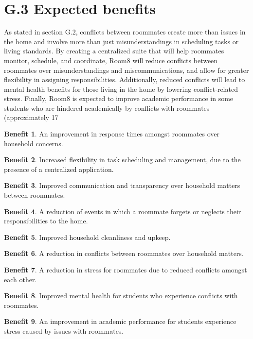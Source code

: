 \documentclass{scrreprt}
\newcommand*{\nsection}[1]{
    \section*{#1}
    \addcontentsline{toc}{section}{#1}
}
\theoremstyle{definition}
\newtheorem{benefit}{Benefit}
\begin{document}
\nsection{G.3 Expected benefits}
\begin{flushleft}
As stated in section G.2, conflicts between roommates create more than issues in the home and involve more than just misunderstandings in scheduling tasks or living standards. By creating a centralized suite that will help roommates monitor, schedule, and coordinate, Room8 will reduce conflicts between roommates over misunderstandings and miscommunications, and allow for greater flexibility in assigning responsibilities. Additionally, reduced conflicts will lead to mental health benefits for those living in the home by lowering conflict-related stress.  Finally, Room8 is expected to improve academic performance in some students who are hindered academically by conflicts with roommates (approximately 17%

\begin{benefit}\label{benefit:first}
An improvement in response times amongst roommates over household concerns.
\end{benefit}

\begin{benefit}\label{benefit:first}
Increased flexibility in task scheduling and management, due to the presence of a centralized application.
\end{benefit}

\begin{benefit}\label{benefit:first}
Improved communication and transparency over household matters between roommates.
\end{benefit}

\begin{benefit}\label{benefit:first}
A reduction of events in which a roommate forgets or neglects their responsibilities to the home.
\end{benefit}

\begin{benefit}\label{benefit:first}
Improved household cleanliness and upkeep.
\end{benefit}

\begin{benefit}\label{benefit:first}
A reduction in conflicts between roommates over household matters.
\end{benefit}

\begin{benefit}\label{benefit:first}
A reduction in stress for roommates due to reduced conflicts amongst each other.\end{benefit}

\begin{benefit}\label{benefit:first}
Improved mental health for students who experience conflicts with roommates.
\end{benefit}

\begin{benefit}\label{benefit:first}
An improvement in academic performance for students experience stress caused by issues with roommates.
\end{benefit}

\end{flushleft}
\end{document}
